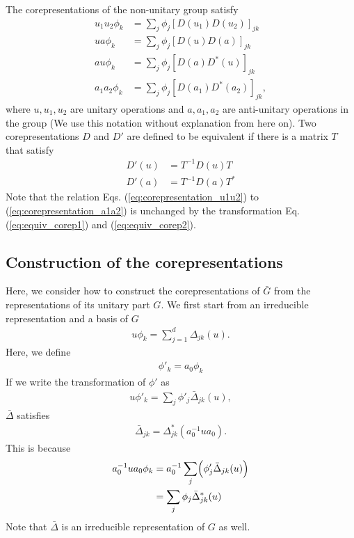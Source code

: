 \documentclass{article}
\begin{document}
The corepresentations of the non-unitary group satisfy
\begin{align}
  u_1 u_2 \phi_k &= \sum_j \phi_j [D(u_1) D(u_2)]_{jk}
  \label{eq:corepresentation_u1u2}
  \\
  u a \phi_k &= \sum_j \phi_j [D(u) D(a)]_{jk}
  \label{eq:corepresentation_ua}
  \\
  au \phi_k &= \sum_j \phi_j [D(a) D^*(u)]_{jk}
  \label{eq:corepresentation_au}
  \\
  a_1 a_2 \phi_k &= \sum_j \phi_j [D(a_1) D^*(a_2)]_{jk},
  \label{eq:corepresentation_a1a2}
\end{align}
where $u, u_1, u_2$ are unitary operations and $a, a_1, a_2$ are anti-unitary operations in the group (We use this notation without explanation from here on).
Two corepresentations $D$ and $D'$ are defined to be equivalent if there is a matrix $T$ that satisfy
\begin{align}
  D'(u) &= T^{-1} D(u) T
  \label{eq:equiv_corep1}
  \\
  D'(a) &= T^{-1} D(a) T^*
  \label{eq:equiv_corep2}
\end{align}
Note that the relation Eqs. (\ref{eq:corepresentation_u1u2}) to (\ref{eq:corepresentation_a1a2}) is unchanged by the transformation Eq. (\ref{eq:equiv_corep1}) and (\ref{eq:equiv_corep2}).

\subsection{Construction of the corepresentations}
Here, we consider how to construct the corepresentations of $\bar{G}$ from the representations of its unitary part $G$.
We first start from an irreducible representation and a basis of $G$
\begin{align}
  u \phi_k = \sum_{j = 1}^d \Delta_{jk}(u).
\end{align}
Here, we define 
\begin{align}
  \phi'_k = a_0 \phi_k
\end{align}
If we write the transformation of $\phi'$ as
\begin{align}
  u \phi'_k = \sum_j \phi'_j \bar{\Delta}_{jk}(u),
\end{align}
$\bar{\Delta}$ satisfies
\begin{align}
  \bar{\Delta}_{jk} = \Delta^*_{jk} (a_0^{-1} u a_0).
\end{align}
This is because
\begin{align}
  a_0^{-1} u a_0 \phi_k 
  &= 
  a_0^{-1}
  \sum_j
  \Bigl(
    \phi'_j \bar{\Delta}_{jk}(u)  
  \Bigr)
  \nonumber
  \\&=
  \sum_j \phi_j \bar{\Delta}^*_{jk}(u)  
\end{align}
Note that $\bar{\Delta}$ is an irreducible representation of $G$ as well.
\end{document}
